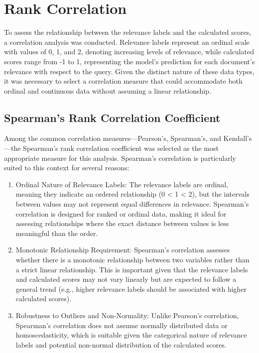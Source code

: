 \section{Rank Correlation}\label{rank-correlation}

To assess the relationship between the relevance labels and the calculated scores, a correlation analysis was conducted. Relevance labels represent an ordinal scale with values of 0, 1, and 2, denoting increasing levels of relevance, while calculated scores range from -1 to 1, representing the model's prediction for each document's relevance with respect to the query. Given the distinct nature of these data types, it was necessary to select a correlation measure that could accommodate both ordinal and continuous data without assuming a linear relationship.

\subsection{Spearman's Rank Correlation Coefficient}\label{spearmans-rank-correlation-coefficient}

Among the common correlation measures—Pearson's, Spearman's, and Kendall's—the Spearman's rank correlation coefficient was selected as the most appropriate measure for this analysis. Spearman's correlation is particularly suited to this context for several reasons:

\begin{enumerate}
    \item Ordinal Nature of Relevance Labels: The relevance labels are ordinal, meaning they indicate an ordered relationship (0 < 1 < 2), but the intervals between values may not represent equal differences in relevance. Spearman's correlation is designed for ranked or ordinal data, making it ideal for assessing relationships where the exact distance between values is less meaningful than the order.
    \item Monotonic Relationship Requirement: Spearman's correlation assesses whether there is a monotonic relationship between two variables rather than a strict linear relationship. This is important given that the relevance labels and calculated scores may not vary linearly but are expected to follow a general trend (e.g., higher relevance labels should be associated with higher calculated scores).
    \item Robustness to Outliers and Non-Normality: Unlike Pearson's correlation, Spearman's correlation does not assume normally distributed data or homoscedasticity, which is suitable given the categorical nature of relevance labels and potential non-normal distribution of the calculated scores.
\end{enumerate}

